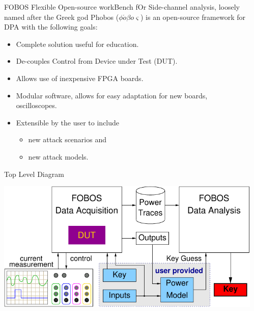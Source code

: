 \documentclass[final]{beamer}
\begin{document}
\begin{frame}[fragile]{}
\begin{columns}[t]
\begin{column}{.31\linewidth}
    \end{column}
    \begin{column}{.31\linewidth}
   
      
      \begin{block}{FOBOS}
        {\color{red}F}lexible {\color{red}O}pen-source work{\color{red}B}ench 
        f{\color{red}O}r {\color{red}S}ide-channel analysis, 
          loosely named after the Greek god Phobos ($\phi \acute{o} \beta o \varsigma$) is 
          an open-source framework for DPA with the following goals: 
        \begin{itemize}
          \item Complete solution useful for education.
          \item De-couples Control from Device under Test (DUT).
          \item Allows use of inexpensive FPGA boards.
          \item Modular software, allows for easy adaptation for new boards, oscilloscopes.
          \item Extensible by the user to include
          \begin{itemize}
            \item new attack scenarios and
            \item new attack models. 
          \end{itemize}
        \end{itemize}
      \end{block}
      \begin{block}{Top Level Diagram}
        \begin{center}
          \includegraphics[scale=1.5]{../figures/fobos-top}
        \end{center} 
       \end{block}
     

\end{column}
\end{columns}
\end{frame}
\end{document}
